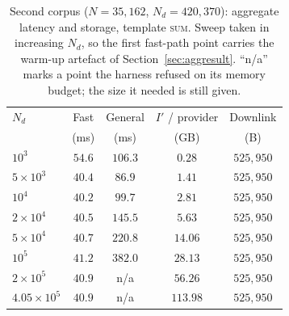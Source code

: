 \documentclass[a4paper,fleqn]{cas-sc}
\begin{document}
\begin{table}[pos=htbp]
\caption{Second corpus ($N=35{,}162$, $N_d=420{,}370$): aggregate latency and
storage, template \textsc{sum}. Sweep taken in increasing $N_d$, so the first
fast-path point carries the warm-up artefact of
Section~\ref{sec:aggresult}. ``n/a'' marks a point the harness refused on its
memory budget; the size it needed is still given.}
\label{tab:beijing}
\centering
\footnotesize
\setlength{\tabcolsep}{3pt}
\renewcommand{\arraystretch}{1.2}
\begin{tabular*}{\tblwidth}{@{\extracolsep{\fill}}lcccc@{}}
\toprule
$N_d$ & Fast & General & $I'$ / provider & Downlink \\
      & (ms) & (ms)     & (GB)            & (B) \\
\midrule
$10^3$             & $54.6$ & $106.3$ & $0.28$   & $525{,}950$ \\
$5\times10^3$      & $40.4$ & $86.9$  & $1.41$   & $525{,}950$ \\
$10^4$             & $40.2$ & $99.7$  & $2.81$   & $525{,}950$ \\
$2\times10^4$      & $40.5$ & $145.5$ & $5.63$   & $525{,}950$ \\
$5\times10^4$      & $40.7$ & $220.8$ & $14.06$  & $525{,}950$ \\
$10^5$             & $41.2$ & $382.0$ & $28.13$  & $525{,}950$ \\
$2\times10^5$      & $40.9$ & n/a     & $56.26$  & $525{,}950$ \\
$4.05\times10^5$   & $40.9$ & n/a     & $113.98$ & $525{,}950$ \\
\bottomrule
\end{tabular*}
\end{table}
\end{document}
